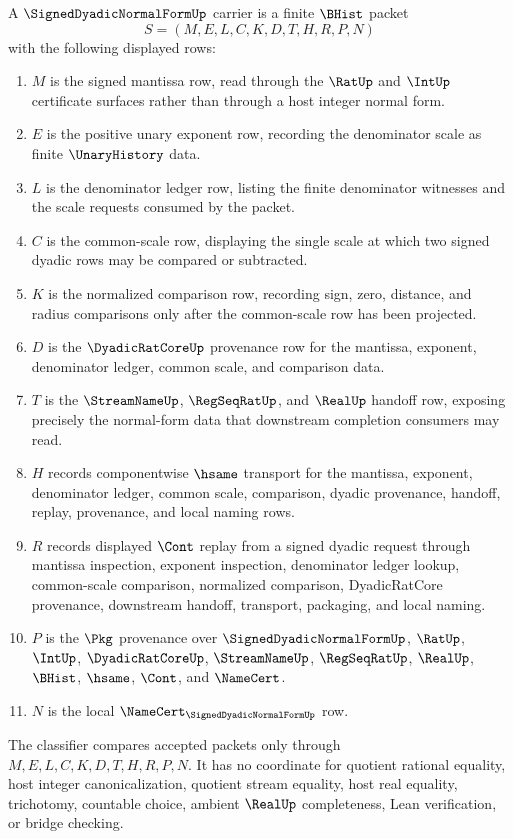 \begin{definition}
\label{def:signed-dyadic-normal-form-carrier}
A $\SignedDyadicNormalFormUp$ carrier is a finite $\BHist$ packet
$$
S=(M,E,L,C,K,D,T,H,R,P,N)
$$
with the following displayed rows:
\begin{enumerate}
\item $M$ is the signed mantissa row, read through the $\RatUp$ and $\IntUp$ certificate surfaces rather than through a host integer normal form.
\item $E$ is the positive unary exponent row, recording the denominator scale as finite $\UnaryHistory$ data.
\item $L$ is the denominator ledger row, listing the finite denominator witnesses and the scale requests consumed by the packet.
\item $C$ is the common-scale row, displaying the single scale at which two signed dyadic rows may be compared or subtracted.
\item $K$ is the normalized comparison row, recording sign, zero, distance, and radius comparisons only after the common-scale row has been projected.
\item $D$ is the $\DyadicRatCoreUp$ provenance row for the mantissa, exponent, denominator ledger, common scale, and comparison data.
\item $T$ is the $\StreamNameUp$, $\RegSeqRatUp$, and $\RealUp$ handoff row, exposing precisely the normal-form data that downstream completion consumers may read.
\item $H$ records componentwise $\hsame$ transport for the mantissa, exponent, denominator ledger, common scale, comparison, dyadic provenance, handoff, replay, provenance, and local naming rows.
\item $R$ records displayed $\Cont$ replay from a signed dyadic request through mantissa inspection, exponent inspection, denominator ledger lookup, common-scale comparison, normalized comparison, DyadicRatCore provenance, downstream handoff, transport, packaging, and local naming.
\item $P$ is the $\Pkg$ provenance over $\SignedDyadicNormalFormUp$, $\RatUp$, $\IntUp$, $\DyadicRatCoreUp$, $\StreamNameUp$, $\RegSeqRatUp$, $\RealUp$, $\BHist$, $\hsame$, $\Cont$, and $\NameCert$.
\item $N$ is the local $\NameCert_{\SignedDyadicNormalFormUp}$ row.
\end{enumerate}
The classifier compares accepted packets only through $M,E,L,C,K,D,T,H,R,P,N$. It has no coordinate for quotient rational equality, host integer canonicalization, quotient stream equality, host real equality, trichotomy, countable choice, ambient $\RealUp$ completeness, Lean verification, or bridge checking.
\end{definition}


